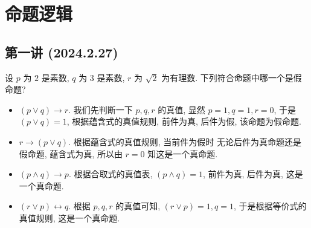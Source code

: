 \documentclass[10pt,UTF8]{book} %
\begin{document}
\frontmatter
\newpage
\pagestyle{plain}
\makeatother

% 



\newpage
\thispagestyle{empty}

\pagestyle{plain}
{\tableofcontents}
\newpage
\thispagestyle{empty}
\cleardoublepage %


\makeatletter
\let\ps@plain\ps@empty
\makeatother

\mainmatter

\chapter{命题逻辑}

\section{第一讲 (2024.2.27)}

\begin{exercise}
    设 $p$ 为 $2$ 是素数, $q$ 为 $3$ 是素数, $r$ 为 $\sqrt{2}$ 为有理数.
    下列符合命题中哪一个是假命题?
    \begin{itemize}[itemsep=0pt]
        \item $(p \vee q) \longrightarrow r$. 我们先判断一下 $p,q,r$ 的真值,
        显然 $p=1,q=1,r=0$, 于是 $(p \vee q) = 1$, 根据蕴含式的真值规则,
        前件为真, 后件为假, 该命题为假命题.
        \item $r \longrightarrow (p \vee q)$. 根据蕴含式的真值规则, 当前件为假时
        无论后件为真命题还是假命题, 蕴含式为真, 所以由 $r=0$ 知这是一个真命题.
        \item $(p \wedge q) \longrightarrow p$. 根据合取式的真值表, $(p \wedge q)=1$,
        前件为真, 后件为真, 这是一个真命题.
        \item $(r \vee p) \longleftrightarrow q$. 根据 $p,q,r$ 的真值可知,
        $(r \vee p)=1, q=1$, 于是根据等价式的真值规则, 这是一个真命题.
    \end{itemize} 
\end{exercise}
\end{document}
